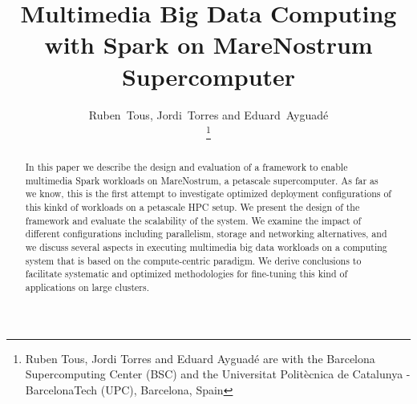 \documentclass[journal]{IEEEtran}
\begin{document}
\title{Multimedia Big Data Computing with Spark on MareNostrum Supercomputer}

%

%                       

\author{
        Ruben~Tous,  
	Jordi~Torres and
	Eduard~Ayguad\'e
	
                       
\thanks{Ruben Tous, Jordi Torres and Eduard Ayguadé are with the Barcelona Supercomputing Center (BSC) and the Universitat Polit\`ecnica de Catalunya - BarcelonaTech (UPC), Barcelona, Spain}
}


%


\maketitle\thispagestyle{empty}


\begin{abstract}
In this paper we describe the design and evaluation of a framework to enable multimedia Spark workloads on MareNostrum, a petascale supercomputer. As far as we know, this is the first attempt to investigate optimized deployment configurations of this kinkd of workloads on a petascale HPC setup. We present the design of the framework and evaluate the scalability of the system. We examine the impact of different configurations including parallelism, storage and networking alternatives, and we discuss several aspects in executing multimedia big data workloads on a computing system that is based on the compute-centric paradigm. We derive conclusions to facilitate systematic and optimized methodologies for fine-tuning this kind of applications on large clusters. 
\end{abstract}
\end{document}
